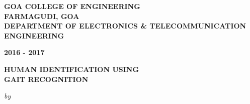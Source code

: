 \begin{center}
%
\bfseries{GOA COLLEGE OF ENGINEERING\\FARMAGUDI, GOA}\\
\vspace{0.4cm}
\bfseries{DEPARTMENT OF ELECTRONICS \& TELECOMMUNICATION ENGINEERING}\\
\vspace{0.4cm}
\begin{large}
\bfseries{2016 - 2017}\\
\end{large}
\vspace{0.5cm}
\begin{figure}[H]
{\centering {}\par}
\end{figure}
\vspace{-1.3cm}
\vspace{0.5cm}
\begin{large}
{\bfseries HUMAN IDENTIFICATION USING \\GAIT RECOGNITION}\\
\end{large}
\vspace{0.3cm}
\begin{small}
\emph{by}\\
\end{small}

\end{center}
